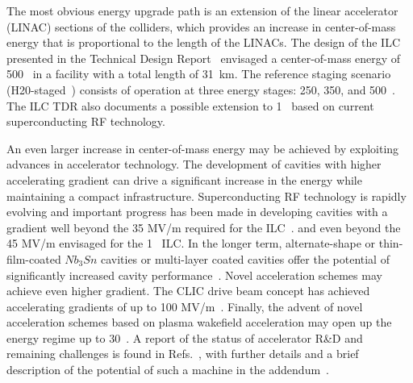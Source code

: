 The most obvious energy upgrade path is an extension of the linear
accelerator (LINAC) sections of the colliders, which provides an increase
in center-of-mass energy that is proportional to the length of the LINACs.
The design of the ILC presented in the Technical Design
Report~\cite{Behnke:2013xla,Adolphsen:2013jya,Adolphsen:2013kya} envisaged a
center-of-mass energy of 500~\GeV{} in a facility with a total length of 31~km.
The reference staging scenario (H20-staged~\cite{Barklow:2015tja}) consists of operation at
three energy stages: 250, 350, and 500~\GeV. The ILC TDR also documents
a possible extension to 1~\TeV{} based on current superconducting RF technology. 



An even larger increase in center-of-mass energy may be achieved by
exploiting advances in accelerator technology. The development of
cavities with higher accelerating gradient can drive a significant
increase in the energy while maintaining a compact infrastructure.
Superconducting RF technology is rapidly evolving and important
progress has been made in developing cavities with a gradient well
beyond the 35 MV/m required for the ILC~\cite{Grassellino:2018tqg,Grassellino:2017bod}.
and even beyond the 45 MV/m envisaged for the 1~\TeV{} ILC. In the longer term, alternate-shape
or thin-film-coated $Nb_3Sn$ cavities or multi-layer coated cavities offer the potential of
significantly increased cavity performance~\cite{Adolphsen:2013jya}.
Novel acceleration schemes may achieve even higher gradient. The CLIC drive beam concept has
achieved accelerating gradients of up to 100 MV/m~\cite{Aicheler:2012bya}.
Finally, the advent of novel acceleration schemes based on plasma wakefield acceleration
may open up the energy regime up to 30~\TeV. A report of the status of accelerator R\&D and remaining
challenges is found in Refs.~\cite{advancedLC2020,advancedLC}, with further details and
a brief description of the potential of such a machine in the
addendum~\cite{advancedLCaddendum}.


